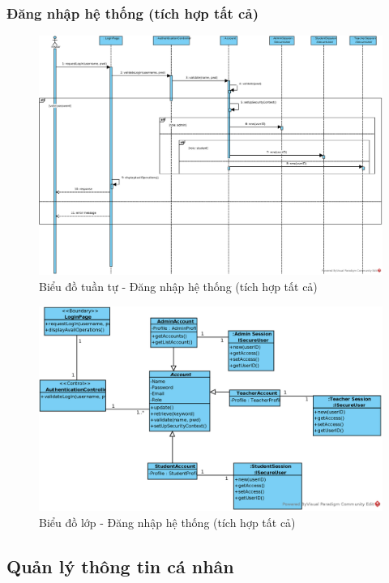 \documentclass[./../main.tex]{subfiles}
\begin{document}
\subsubsection{Đăng nhập hệ thống (tích hợp tất cả)}
\begin{figure}[H]
    \centering
    \includegraphics[width=\linewidth]{./images/UseCaseDesignDiagram/ucr_sec_login.eps}
    \caption{Biểu đồ tuần tự - Đăng nhập hệ thống (tích hợp tất cả)}
\end{figure}
\begin{figure}[H]
    \centering
    \includegraphics[width=\linewidth]{./images/UseCaseDesignDiagram/ucd_sec_login.eps}
    \caption{Biểu đồ lớp - Đăng nhập hệ thống (tích hợp tất cả)}
\end{figure}


\subsection{Quản lý thông tin cá nhân}
\end{document}
